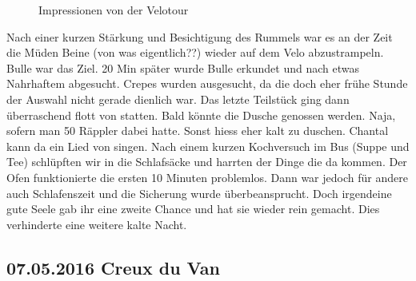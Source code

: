 \begin{figure}[H]
   \centering
   \quad
   \quad
   \quad
   \caption[Impressionen von der Velotour]{Impressionen von der Velotour}
\end{figure}

Nach einer kurzen Stärkung und Besichtigung des Rummels war es an der Zeit die Müden Beine (von was eigentlich??) wieder auf dem Velo abzustrampeln.
Bulle war das Ziel.
20 Min später wurde Bulle erkundet und nach etwas Nahrhaftem abgesucht.
Crepes wurden ausgesucht, da die doch eher frühe Stunde der Auswahl nicht gerade dienlich war.
Das letzte Teilstück ging dann überraschend flott von statten.
Bald könnte die Dusche genossen werden.
Naja, sofern man 50 Räppler dabei hatte.
Sonst hiess eher kalt zu duschen.
Chantal kann da ein Lied von singen.
Nach einem kurzen Kochversuch im Bus (Suppe und Tee) schlüpften wir in die Schlafsäcke und harrten der Dinge die da kommen.
Der Ofen funktionierte die ersten 10 Minuten problemlos.
Dann war jedoch für andere auch Schlafenszeit und die Sicherung wurde überbeansprucht.
Doch irgendeine gute Seele gab ihr eine zweite Chance und hat sie wieder rein gemacht.
Dies verhinderte eine weitere kalte Nacht.

\subsection{07.05.2016 Creux du Van}

